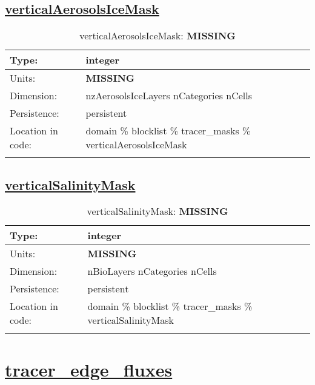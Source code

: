 \subsection[verticalAerosolsIceMask]{\hyperref[sec:var_tab_tracer_masks]{verticalAerosolsIceMask}}
\label{subsec:var_sec_tracer_masks_verticalAerosolsIceMask}
\begin{center}
\begin{longtable}{| p{2.0in} | p{4.0in} |}
        \hline 
        Type: & integer \\
        \hline 
        Units: & {\bf \color{red} MISSING} \\
        \hline 
        Dimension: & nzAerosolsIceLayers nCategories nCells \\
        \hline 
        Persistence: & persistent \\
        \hline 
         Location in code: & domain \% blocklist \% tracer\_masks \% verticalAerosolsIceMask \\
         \hline 
    \caption{verticalAerosolsIceMask: {\bf \color{red} MISSING}}
\end{longtable}
\end{center}
\subsection[verticalSalinityMask]{\hyperref[sec:var_tab_tracer_masks]{verticalSalinityMask}}
\label{subsec:var_sec_tracer_masks_verticalSalinityMask}
\begin{center}
\begin{longtable}{| p{2.0in} | p{4.0in} |}
        \hline 
        Type: & integer \\
        \hline 
        Units: & {\bf \color{red} MISSING} \\
        \hline 
        Dimension: & nBioLayers nCategories nCells \\
        \hline 
        Persistence: & persistent \\
        \hline 
         Location in code: & domain \% blocklist \% tracer\_masks \% verticalSalinityMask \\
         \hline 
    \caption{verticalSalinityMask: {\bf \color{red} MISSING}}
\end{longtable}
\end{center}
\section[tracer\_edge\_fluxes]{\hyperref[sec:var_tab_tracer_edge_fluxes]{tracer\_edge\_fluxes}}
\label{sec:var_sec_tracer_edge_fluxes}
